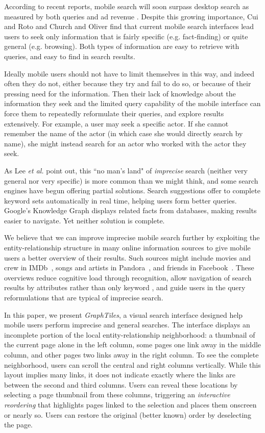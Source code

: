 According to recent reports, mobile search will soon surpass desktop search as measured by both queries and ad revenue \cite{MobileQueries}\cite{MobileRevenue}. Despite this growing importance, Cui and Roto \cite{Cui:2008} and Church and Oliver \cite{Church:2011} find that current mobile search interfaces lead users to seek only information that is fairly specific (e.g. fact-finding) or quite general (e.g. browsing). Both types of information are easy to retrieve with queries, and easy to find in search results.

Ideally mobile users should not have to limit themselves in this way, and indeed often they do not, either because they try and fail to do so, or because of their pressing need for the information. Then their lack of knowledge about the information they seek and the limited query capability of the mobile interface \cite{Kamvar:2009} can force them to repeatedly reformulate their queries, and explore results extensively. For example, a user may seek a specific actor. If she cannot remember the name of the actor (in which case she would directly search by name), she might instead search for an actor who worked with the actor they seek.

As Lee \textit{et al.} \cite{Lee:2012} point out, this ``no man's land" of \textit{imprecise} search (neither very general nor very specific) is more common than we might think, and some search engines have begun offering partial solutions. Search suggestions offer to complete keyword sets automatically in real time, helping users form better queries. Google's Knowledge Graph displays related facts from databases, making results easier to navigate. Yet neither solution is complete.

We believe that we can improve imprecise mobile search further by exploiting the entity-relationship structure in many online information sources to give mobile users a better overview of their results. Such sources might include movies and crew in IMDb~\cite{imdb}, songs and artists in Pandora~\cite{pandora}, and friends in Facebook~\cite{Facebook}. These overviews reduce cognitive load through recognition, allow navigation of search results by attributes rather than only keyword \cite{Hearst:2002}, and guide users in the query reformulations that are typical of imprecise search.

In this paper, we present \textit{GraphTiles}, a visual search interface designed help mobile users perform imprecise and general searches. The interface displays an incomplete portion of the local entity-relationship neighborhood: a thumbnail of the current page alone in the left column, some pages one link away in the middle column, and other pages two links away in the right column. To see the complete neighborhood, users can scroll the central and right columns vertically. While this layout implies many links, it does not indicate exactly where the links are between the second and third columns. Users can reveal these locations by selecting a page thumbnail from these columns, triggering an \textit{interactive reordering} that highlights pages linked to the selection and places them onscreen or nearly so. Users can restore the original (better known) order by deselecting the page.